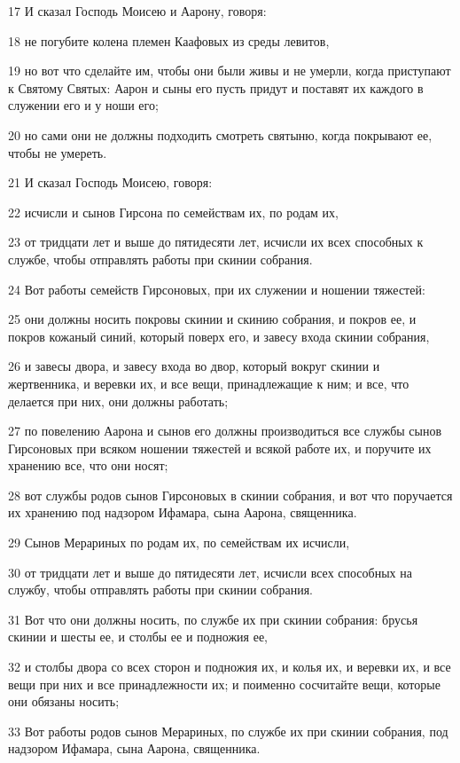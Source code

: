 \par 17 И сказал Господь Моисею и Аарону, говоря:
\par 18 не погубите колена племен Каафовых из среды левитов,
\par 19 но вот что сделайте им, чтобы они были живы и не умерли, когда приступают к Святому Святых: Аарон и сыны его пусть придут и поставят их каждого в служении его и у ноши его;
\par 20 но сами они не должны подходить смотреть святыню, когда покрывают ее, чтобы не умереть.
\par 21 И сказал Господь Моисею, говоря:
\par 22 исчисли и сынов Гирсона по семействам их, по родам их,
\par 23 от тридцати лет и выше до пятидесяти лет, исчисли их всех способных к службе, чтобы отправлять работы при скинии собрания.
\par 24 Вот работы семейств Гирсоновых, при их служении и ношении тяжестей:
\par 25 они должны носить покровы скинии и скинию собрания, и покров ее, и покров кожаный синий, который поверх его, и завесу входа скинии собрания,
\par 26 и завесы двора, и завесу входа во двор, который вокруг скинии и жертвенника, и веревки их, и все вещи, принадлежащие к ним; и все, что делается при них, они должны работать;
\par 27 по повелению Аарона и сынов его должны производиться все службы сынов Гирсоновых при всяком ношении тяжестей и всякой работе их, и поручите их хранению все, что они носят;
\par 28 вот службы родов сынов Гирсоновых в скинии собрания, и вот что поручается их хранению под надзором Ифамара, сына Аарона, священника.
\par 29 Сынов Мерариных по родам их, по семействам их исчисли,
\par 30 от тридцати лет и выше до пятидесяти лет, исчисли всех способных на службу, чтобы отправлять работы при скинии собрания.
\par 31 Вот что они должны носить, по службе их при скинии собрания: брусья скинии и шесты ее, и столбы ее и подножия ее,
\par 32 и столбы двора со всех сторон и подножия их, и колья их, и веревки их, и все вещи при них и все принадлежности их; и поименно сосчитайте вещи, которые они обязаны носить;
\par 33 Вот работы родов сынов Мерариных, по службе их при скинии собрания, под надзором Ифамара, сына Аарона, священника.
